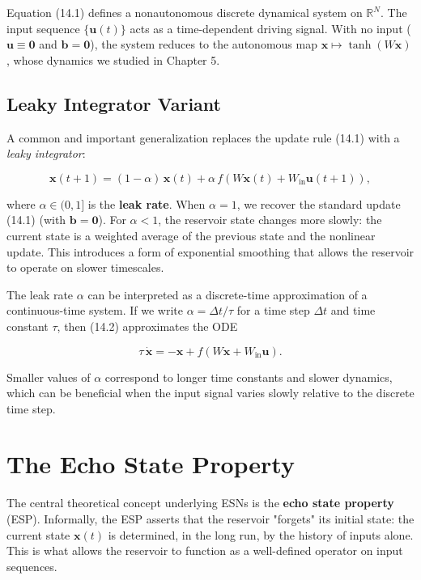 \begin{remark}
Equation (14.1) defines a nonautonomous discrete dynamical system on $\mathbb{R}^N$. The input sequence $\{\mathbf{u}(t)\}$ acts as a time-dependent driving signal. With no input ($\mathbf{u} \equiv \mathbf{0}$ and $\mathbf{b} = \mathbf{0}$), the system reduces to the autonomous map $\mathbf{x} \mapsto \tanh(W\mathbf{x})$, whose dynamics we studied in Chapter 5.
\end{remark}


\subsection{Leaky Integrator Variant}\label{sec:14.1.3}

A common and important generalization replaces the update rule (14.1) with a \textit{leaky integrator}:

\begin{equation}\label{eq:14.2}\tag{14.2}
\mathbf{x}(t+1) = (1 - \alpha)\,\mathbf{x}(t) + \alpha\, f\!\left(W\mathbf{x}(t) + W_{\text{in}}\mathbf{u}(t+1)\right),
\end{equation}

where $\alpha \in (0, 1]$ is the \textbf{leak rate}. When $\alpha = 1$, we recover the standard update (14.1) (with $\mathbf{b} = \mathbf{0}$). For $\alpha < 1$, the reservoir state changes more slowly: the current state is a weighted average of the previous state and the nonlinear update. This introduces a form of exponential smoothing that allows the reservoir to operate on slower timescales.

The leak rate $\alpha$ can be interpreted as a discrete-time approximation of a continuous-time system. If we write $\alpha = \Delta t / \tau$ for a time step $\Delta t$ and time constant $\tau$, then (14.2) approximates the ODE

\[
\tau \,\dot{\mathbf{x}} = -\mathbf{x} + f(W\mathbf{x} + W_{\text{in}}\mathbf{u}).
\]

Smaller values of $\alpha$ correspond to longer time constants and slower dynamics, which can be beneficial when the input signal varies slowly relative to the discrete time step.


\bigskip


\section{The Echo State Property}\label{sec:14.2}

The central theoretical concept underlying ESNs is the \textbf{echo state property} (ESP). Informally, the ESP asserts that the reservoir "forgets" its initial state: the current state $\mathbf{x}(t)$ is determined, in the long run, by the history of inputs alone. This is what allows the reservoir to function as a well-defined operator on input sequences.

